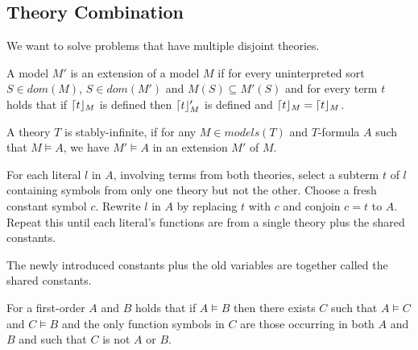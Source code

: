 \subsection{Theory Combination}
\begin{mytitle} We want to solve problems that have multiple disjoint theories.
\end{mytitle}
\begin{mytitle}[Extension] A model $M'$ is an extension of a model $M$ if for every uninterpreted sort $S\in dom(M)$, $S\in dom(M')$ and $M(S) \subseteq M'(S)$ and for every term $t$ holds that if $\lceil t\rfloor_M$ is defined then $\lceil t\rfloor_M'$ is defined and $\lceil t\rfloor_M = \lceil t\rfloor_M$.
\end{mytitle}
\begin{mytitle} A theory $T$ is stably-infinite, if for any $M\in models(T)$ and $T$-formula $A$ such that $M\models A$, we have $M'\models A$ in an extension $M'$ of $M$.
\end{mytitle}
\begin{mytitle}[Purification] For each literal $l$ in $A$, involving terms from both theories, select a subterm $t$ of $l$ containing symbols from only one theory but not the other. Choose a fresh constant symbol $c$. Rewrite $l$ in $A$ by replacing $t$ with $c$ and conjoin $c=t$ to $A$. Repeat this until each literal's functions are from a single theory plus the shared constants. 
    \begin{mysubtitle} The newly introduced constants plus the old variables are together called the shared constants.
    \end{mysubtitle}
\end{mytitle}
\begin{mytitle} For a first-order $A$ and $B$ holds that if $A\models B$ then there exists $C$ such that $A\models C$ and $C\models B$ and the only function symbols in $C$ are those occurring in both $A$ and $B$ and such that $C$ is not $A$ or $B$.
\end{mytitle}
